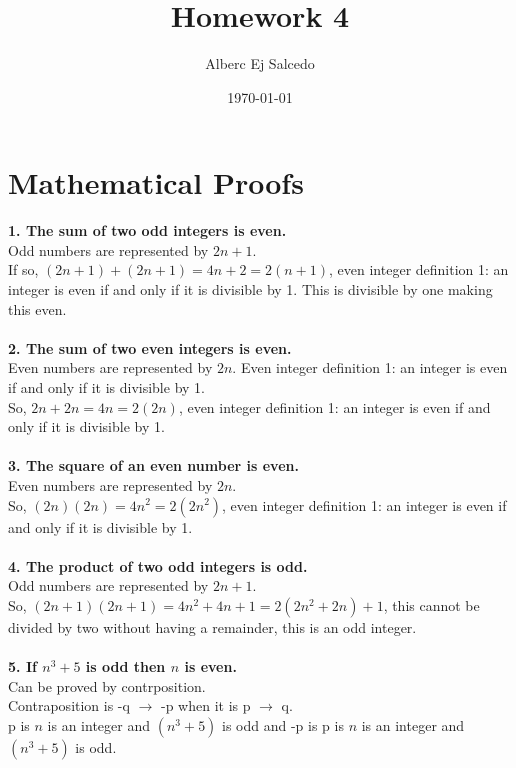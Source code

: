 \documentclass[11pt]{article}
\begin{document}
\title{Homework 4}
\author{Alberc Ej Salcedo}
\date{\today}
\maketitle
\section{Mathematical Proofs}
\textbf{1.  The sum of two odd integers is even.}\\
Odd numbers are represented by $2n+1$.\\
If so, $(2n+1)+(2n+1)=4n+2=2(n+1)$, even integer definition 1: an integer is even if and only if it is divisible by 1. This is divisible by one making this even.\\
\\
\textbf{2. The sum of two even integers is even.}\\
Even numbers are represented by $2n$. Even integer definition 1: an integer is even if and only if it is divisible by 1.\\
So, $2n+2n=4n=2(2n)$, even integer definition 1: an integer is even if and only if it is divisible by 1.\\
\\
\textbf{3. The square of an even number is even.}\\
Even numbers are represented by $2n$.\\
So, $(2n)(2n)=4n^2=2(2n^2)$, even integer definition 1: an integer is even if and only if it is divisible by 1.\\
\\
\textbf{4. The product of two odd integers is odd.}\\
Odd numbers are represented by $2n+1$.\\
So, $(2n+1)(2n+1)=4n^2+4n+1=2(2n^2+2n)+1$, this cannot be divided by two without having a remainder, this is an odd integer.\\
\\
\textbf{5. If $n^3+5$ is odd then $n$ is even.}\\
Can be proved by contrposition.\\
Contraposition is -q $\rightarrow$ -p when it is p $\rightarrow$ q.\\
p is $n$ is an integer and $(n^3+5)$ is odd and -p is p is $n$ is an integer and $(n^3+5)$ is odd.\\
\end{document}
